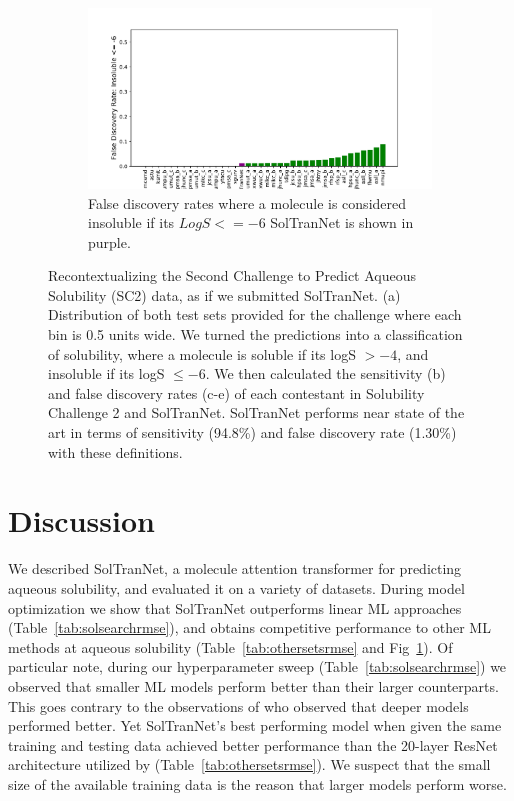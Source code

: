 \documentclass[journal=jmcmar,manuscript=article]{achemso}
\begin{document}
\begin{figure}[tb]
    \begin{subfigure}[t]{0.48\textwidth}
        \centering
        \includegraphics[width=\linewidth]{figures/fail_-6_solchal2.pdf}
        \caption{False discovery rates where a molecule is considered insoluble if its $LogS <=-6$ SolTranNet is shown in purple.}
    \end{subfigure}
    \caption{Recontextualizing the Second Challenge to Predict Aqueous Solubility (SC2) data, as if we submitted SolTranNet. (a) Distribution of both test sets provided for the challenge where each bin is 0.5 units wide. We turned the predictions into a classification of solubility, where a molecule is soluble if its logS $> -4$, and insoluble if its logS $\leq -6$. We then calculated the sensitivity (b) and false discovery rates (c-e) of each contestant in Solubility Challenge 2 and SolTranNet. SolTranNet performs near state of the art in terms of sensitivity (94.8\%) and false discovery rate (1.30\%) with these definitions.}
    \label{fig:sc2redo}
\end{figure}

\section{Discussion}

We described SolTranNet, a molecule attention transformer for predicting aqueous solubility, and evaluated it on a variety of datasets.
During model optimization we show that SolTranNet outperforms linear ML approaches (Table~\ref{tab:solsearchrmse}), and obtains competitive performance to other ML methods at aqueous solubility (Table~\ref{tab:othersetsrmse} and Fig~\ref{fig:sc2redo}).
Of particular note, during our hyperparameter sweep (Table~\ref{tab:solsearchrmse}) we observed that smaller ML models perform better than their larger counterparts.
This goes contrary to the observations of \citet{cui} who observed that deeper models performed better.
Yet SolTranNet's best performing model when given the same training and testing data achieved better performance than the 20-layer ResNet architecture utilized by \citet{cui} (Table~\ref{tab:othersetsrmse}).
We suspect that the small size of the available training data is the reason that larger models perform worse.
\end{document}
